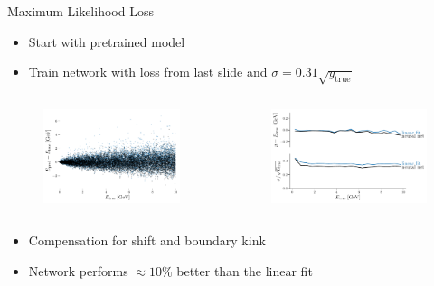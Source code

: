\documentclass[10pt]{beamer}
\begin{document}
\begin{frame}{Maximum Likelihood Loss}
  \begin{itemize}
  \item Start with pretrained model
  \item Train network with loss from last slide and $\sigma = 0.31 \sqrt{y_{\text{true}}}$
  \end{itemize}
  \begin{columns}
    \begin{figure}[htp]
      \includegraphics[width=1.1\textwidth]{../images/likelihood.png}
    \end{figure}
    \begin{figure}[htp]
      \includegraphics[width=1.1\textwidth]{../images/likelihood_res.png}
    \end{figure}
  \end{columns}

  \begin{itemize}
  \item Compensation for shift and boundary kink
  \item Network performs $\approx 10\%$ better than the linear fit 
  \end{itemize}
  
\end{frame}
\end{document}
